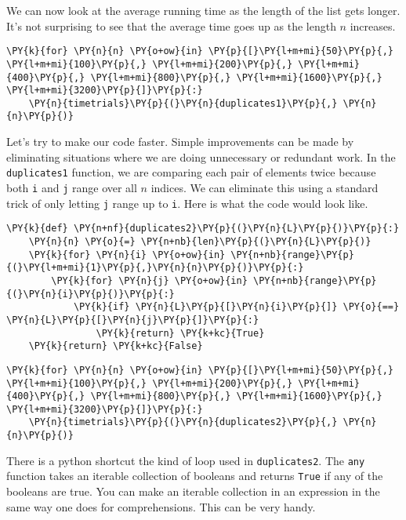 We can now look at the average running time as the length of the list gets longer.
It's not surprising to see that the average time goes up as the length $n$ increases.

\begin{Verbatim}[commandchars=\\\{\}]
\PY{k}{for} \PY{n}{n} \PY{o+ow}{in} \PY{p}{[}\PY{l+m+mi}{50}\PY{p}{,} \PY{l+m+mi}{100}\PY{p}{,} \PY{l+m+mi}{200}\PY{p}{,} \PY{l+m+mi}{400}\PY{p}{,} \PY{l+m+mi}{800}\PY{p}{,} \PY{l+m+mi}{1600}\PY{p}{,} \PY{l+m+mi}{3200}\PY{p}{]}\PY{p}{:}
    \PY{n}{timetrials}\PY{p}{(}\PY{n}{duplicates1}\PY{p}{,} \PY{n}{n}\PY{p}{)}
\end{Verbatim}



Let's try to make our code faster.
Simple improvements can be made by eliminating situations where we are doing unnecessary or redundant work.
In the \texttt{duplicates1} function, we are comparing each pair of elements twice because both \texttt{i} and \texttt{j} range over all $n$ indices.
We can eliminate this using a standard trick of only letting \texttt{j} range up to \texttt{i}.
Here is what the code would look like.

\begin{Verbatim}[commandchars=\\\{\}]
\PY{k}{def} \PY{n+nf}{duplicates2}\PY{p}{(}\PY{n}{L}\PY{p}{)}\PY{p}{:}
    \PY{n}{n} \PY{o}{=} \PY{n+nb}{len}\PY{p}{(}\PY{n}{L}\PY{p}{)}
    \PY{k}{for} \PY{n}{i} \PY{o+ow}{in} \PY{n+nb}{range}\PY{p}{(}\PY{l+m+mi}{1}\PY{p}{,}\PY{n}{n}\PY{p}{)}\PY{p}{:}
        \PY{k}{for} \PY{n}{j} \PY{o+ow}{in} \PY{n+nb}{range}\PY{p}{(}\PY{n}{i}\PY{p}{)}\PY{p}{:}
            \PY{k}{if} \PY{n}{L}\PY{p}{[}\PY{n}{i}\PY{p}{]} \PY{o}{==} \PY{n}{L}\PY{p}{[}\PY{n}{j}\PY{p}{]}\PY{p}{:}
                \PY{k}{return} \PY{k+kc}{True}
    \PY{k}{return} \PY{k+kc}{False}
\end{Verbatim}


\begin{Verbatim}[commandchars=\\\{\}]
\PY{k}{for} \PY{n}{n} \PY{o+ow}{in} \PY{p}{[}\PY{l+m+mi}{50}\PY{p}{,} \PY{l+m+mi}{100}\PY{p}{,} \PY{l+m+mi}{200}\PY{p}{,} \PY{l+m+mi}{400}\PY{p}{,} \PY{l+m+mi}{800}\PY{p}{,} \PY{l+m+mi}{1600}\PY{p}{,} \PY{l+m+mi}{3200}\PY{p}{]}\PY{p}{:}
    \PY{n}{timetrials}\PY{p}{(}\PY{n}{duplicates2}\PY{p}{,} \PY{n}{n}\PY{p}{)}
\end{Verbatim}



There is a python shortcut the kind of loop used in \texttt{duplicates2}.
The \texttt{any} function takes an iterable collection of booleans and returns \texttt{True} if any of the booleans are true.
You can make an iterable collection in an expression in the same way one does for comprehensions.
This can be very handy.

